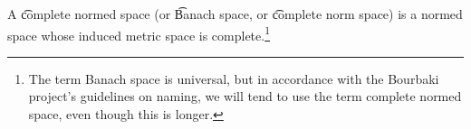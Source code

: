 


A \t{complete normed space} (or \t{Banach space}, or \t{complete norm space}) is a normed space whose induced metric space is complete.\footnote{The term Banach space is universal, but in accordance with the Bourbaki project's guidelines on naming, we will tend to use the term complete normed space, even though this is longer.}

\blankpage
